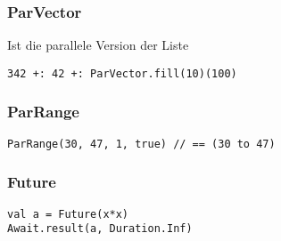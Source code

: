 \subsubsection{ParVector}
Ist die parallele Version der Liste
\begin{verbatim}
342 +: 42 +: ParVector.fill(10)(100)
\end{verbatim}
\subsubsection{ParRange}
\begin{verbatim}
ParRange(30, 47, 1, true) // == (30 to 47)
\end{verbatim}
\subsubsection{Future}
\begin{verbatim}
val a = Future(x*x)
Await.result(a, Duration.Inf)
\end{verbatim}





